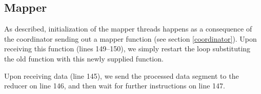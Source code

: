 \subsection{Mapper}
As described, initialization of the mapper threads happens as a consequence of
the coordinator sending out a mapper function (see section \ref{coordinator}).
Upon receiving this function (lines 149--150), we simply restart the loop
substituting the old function with this newly supplied function.


Upon receiving data (line 145), we send the processed data segment to the
reducer on line 146, and then wait for further instructions on line 147.
